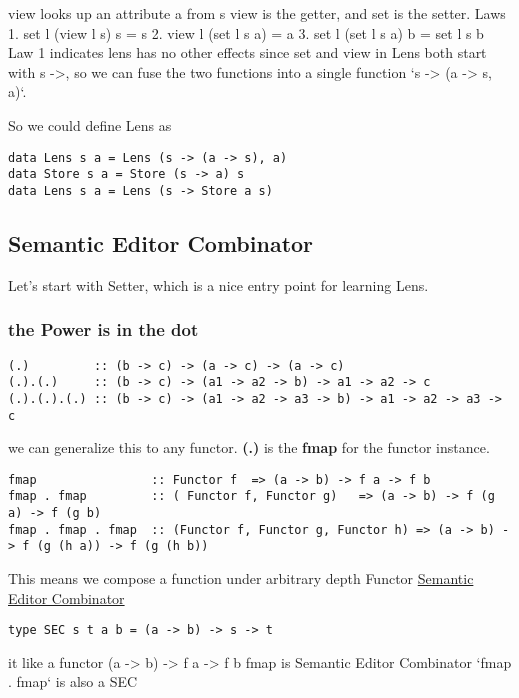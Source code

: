 view looks up an attribute a from s
view is the getter, and set is the setter.
Laws
1. set l (view l s) s = s
2. view l (set l s a) = a
3. set l (set l s a) b = set l s b
Law 1 indicates lens has no other effects
since set and view in Lens both start with s ->, so we can fuse the two functions into a single function
`s -> (a -> s, a)`.

So we could define Lens as
\begin{verbatim}
data Lens s a = Lens (s -> (a -> s), a)
data Store s a = Store (s -> a) s
data Lens s a = Lens (s -> Store a s)
\end{verbatim}


\subsection{Semantic Editor Combinator}
Let's start with Setter, which is a nice entry point for learning Lens.

\subsubsection{the Power is in the dot}
\vspace{1mm}
\begin{verbatim}
(.)         :: (b -> c) -> (a -> c) -> (a -> c)
(.).(.)     :: (b -> c) -> (a1 -> a2 -> b) -> a1 -> a2 -> c
(.).(.).(.) :: (b -> c) -> (a1 -> a2 -> a3 -> b) -> a1 -> a2 -> a3 -> c
\end{verbatim}
\vspace{1mm}




we can generalize this to any functor. \textbf{(.)} is the \textbf{fmap} for the functor instance.

\begin{verbatim}
fmap                :: Functor f  => (a -> b) -> f a -> f b
fmap . fmap         :: ( Functor f, Functor g)   => (a -> b) -> f (g a) -> f (g b)
fmap . fmap . fmap  :: (Functor f, Functor g, Functor h) => (a -> b) -> f (g (h a)) -> f (g (h b))
\end{verbatim}

This means we compose a function under arbitrary depth Functor
\href{http://conal.net/blog/posts/semantic-editor-combinators}{Semantic Editor Combinator}

\begin{verbatim}
type SEC s t a b = (a -> b) -> s -> t
\end{verbatim}
it like a functor (a -> b) -> f a -> f b
fmap is Semantic Editor Combinator
`fmap . fmap` is also a SEC


